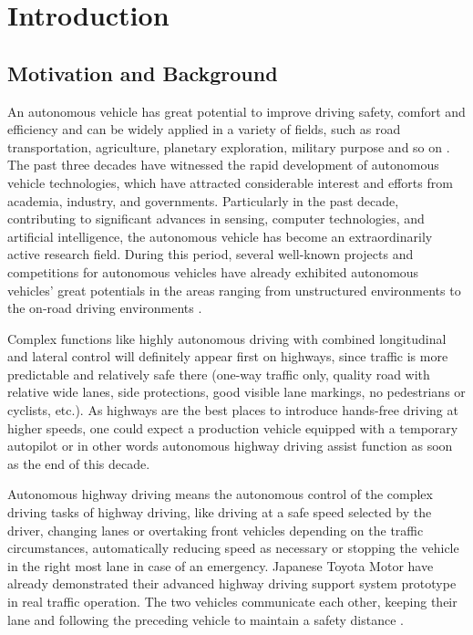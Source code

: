 \chapter{Introduction}


\section{Motivation and Background}


An autonomous vehicle has great potential to improve driving safety, comfort and efficiency and can be widely applied in a variety of fields, such as road transportation, agriculture, planetary exploration, military purpose and so on \cite {WANG2015727}. The past three decades have witnessed the rapid development of autonomous vehicle technologies, which have attracted considerable interest and efforts from academia, industry, and governments. Particularly in the past decade, contributing to significant advances in sensing, computer technologies, and artificial intelligence, the autonomous vehicle has become an extraordinarily active research field. During this period, several well-known projects and competitions for autonomous vehicles have already exhibited autonomous vehicles' great potentials in the areas ranging from unstructured environments to the on-road driving environments \cite{AutonomousStructured} \cite{DrivingUrban2008}.


Complex functions like highly autonomous driving with combined longitudinal and lateral control will definitely appear first on highways, since traffic is more predictable and relatively safe there (one-way traffic only, quality road with relative wide lanes, side protections, good visible lane markings, no pedestrians or cyclists, etc.). As highways are the best places to introduce hands-free driving at higher speeds, one could expect a production vehicle equipped with a temporary autopilot or in other words autonomous highway driving assist function as soon as the end of this decade. 

Autonomous highway driving means the autonomous control of the complex driving tasks of highway driving, like driving at a safe speed selected by the driver, changing lanes or overtaking front vehicles depending on the traffic circumstances, automatically reducing speed as necessary or stopping the vehicle in the right most lane in case of an emergency. Japanese Toyota Motor have already demonstrated their advanced highway driving support system prototype in real traffic operation. The two vehicles  communicate each other, keeping their lane and following the preceding vehicle to maintain a safety distance \cite{Nissan2013}.

